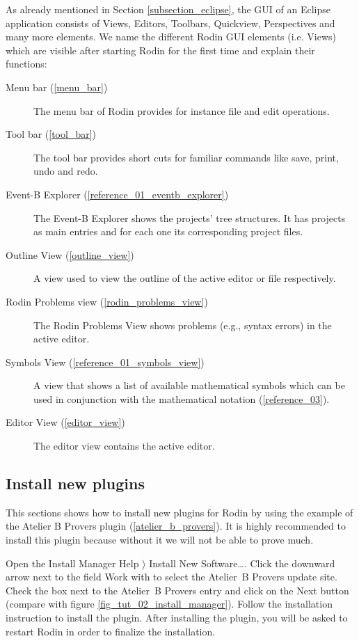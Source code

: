 As already mentioned in Section \ref{subsection_eclipse}, the GUI of an Eclipse application consists of Views, Editors, Toolbars, Quickview, Perspectives and many more elements. We name the different Rodin GUI elements (i.e. Views) which are visible after starting Rodin for the first time and explain their functions:

\begin{description}
	\item[Menu bar (\ref{menu_bar})] The menu bar of Rodin provides for instance file and edit operations.
	\item[Tool bar (\ref{tool_bar})] The tool bar provides short cuts for familiar commands like save, print, undo and redo.
	\item[Event-B Explorer (\ref{reference_01_eventb_explorer})] The Event-B Explorer shows the projects' tree structures. It has projects as main entries and for each one its corresponding project files.
	\item[Outline View (\ref{outline_view})] A view used to view the outline of the active editor or file respectively.
	\item[Rodin Problems view (\ref{rodin_problems_view})] The Rodin Problems View shows problems (e.g., syntax errors) in the active editor.
	\item[Symbols View (\ref{reference_01_symbols_view})] A view that shows a list of available mathematical symbols which can be used in conjunction with the mathematical notation (\ref{reference_03}).
	\item[Editor View (\ref{editor_view})] The editor view contains the active editor.
\end{description}

\subsection{Install new plugins}

This sections shows how to install new plugins for Rodin by using the example of the Atelier B Provers plugin (\ref{atelier_b_provers}). It is highly recommended to install this plugin because without it we will not be able to prove much.

Open the Install Manager \textsf{Help $\rangle$ Install New Software\ldots}. Click the downward arrow next to the field \textsf{Work with} to select the Atelier~B Provers update site. Check the box next to the Atelier~B Provers entry and click on the \textsf{Next} button (compare with figure \ref{fig_tut_02_install_manager}). Follow the installation instruction to install the plugin. After installing the plugin, you will be asked to restart Rodin in order to finalize the installation.

